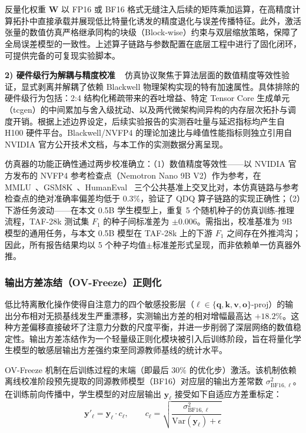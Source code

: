 \documentclass[11pt, a4paper]{article}
\begin{document}
反量化权重 $\widehat{\bm{W}}$ 以 FP16 或 BF16 格式无缝注入后续的矩阵乘加运算，在高精度计算拓扑中直接承载并展现低比特量化诱发的精度退化与误差传播特征。此外，激活张量的数值仿真严格继承同构的块级（Block-wise）约束与双层缩放策略，保障了全局误差模型的一致性。上述算子链路与参数配置在底层工程中进行了固化闭环，可提供完备的可复现实验脚本。

\textbf{2) 硬件级行为解耦与精度校准}
~ 仿真协议聚焦于算法层面的数值精度等效性验证，显式剥离并解耦了依赖 Blackwell 物理架构实现的特有加速属性。具体排除的硬件级行为包括：2:4 结构化稀疏带来的吞吐增益、特定 Tensor Core 生成单元（tcgen）的中间累加与舍入级扰动、以及两代微架构间异构的内存层次拓扑与调度开销。根据上述边界设定，后续实验报告的实测吞吐量与延迟指标均产生自 H100 硬件平台。Blackwell/NVFP4 的理论加速比与峰值性能指标则独立引用自 NVIDIA 官方公开技术文档，与本工作的实测数据分离呈现。

仿真器的功能正确性通过两步校准确立：（1）数值精度等效性——以 NVIDIA 官方发布的 NVFP4 参考检查点（Nemotron Nano 9B V2）作为参考，在 MMLU~\cite{30}、GSM8K~\cite{31}、HumanEval~\cite{32} 三个公共基准上交叉比对，本仿真链路与参考检查点的绝对准确率偏差均低于 $0.3\%$，验证了 QDQ 算子链路的实现正确性；（2）下游任务波动——在本文 0.5B 学生模型上，重复 5 个随机种子的仿真训练-推理流程，TAF-28k 测试集 $F_1$ 的种子间标准差为 $\pm 0.006$。需指出，校准基准为 9B 模型的通用任务，与本文 0.5B 模型在 TAF-28k 上的下游 $F_1$ 之间存在外推鸿沟；因此，所有报告结果均以 5 个种子均值$\pm$标准差形式呈现，而非依赖单一仿真器外推。

\subsubsection{输出方差冻结（OV-Freeze）正则化}

低比特离散化操作使得自注意力的四个敏感投影层（$\ell \in \{\bm{q}, \bm{k}, \bm{v}, \bm{o}\}{\text{-proj}}$）的输出分布相对无损基线发生严重漂移，实测输出方差的相对增幅最高达 $+18.2\%$。这种方差偏移直接破坏了注意力分数的尺度平衡，并进一步削弱了深层网络的数值稳定性。输出方差冻结作为一个轻量级正则化模块被引入后训练阶段，旨在将量化学生模型的敏感层输出方差强约束至同源教师基线的统计水平。

OV-Freeze 机制在后训练过程的末端（即最后 $30\%$ 的优化步）激活。该机制依赖离线校准阶段预先提取的同源教师模型（BF16）对应层的输出方差常数 $\sigma^2_{\text{BF16},\ell}$。在训练前向传播中，学生模型的对应层输出 $\bm{y}_\ell$ 接受如下自适应方差重标定：
\begin{equation}
\label{eq:ov_freeze_rescale}
    \bm{y}'_\ell
    = \bm{y}_\ell \cdot c_\ell,
    \qquad
    c_\ell
    = \sqrt{\frac{\sigma^2_{\text{BF16},\ell}}{\mathrm{Var}(\bm{y}_\ell)+\epsilon}}
\end{equation}
\end{document}
